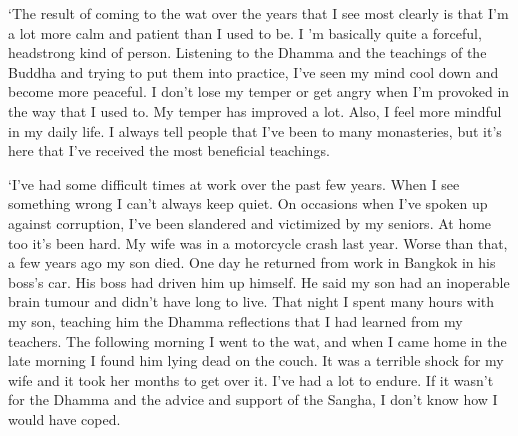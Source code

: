`The result of coming to the wat over the years that I see most clearly
is that I'm a lot more calm and patient than I used to be. I 'm
basically quite a forceful, headstrong kind of person. Listening to the
Dhamma and the teachings of the Buddha and trying to put them into
practice, I've seen my mind cool down and become more peaceful. I don't
lose my temper or get angry when I'm provoked in the way that I used to.
My temper has improved a lot. Also, I feel more mindful in my daily
life. I always tell people that I've been to many monasteries, but it's
here that I've received the most beneficial teachings.

`I've had some difficult times at work over the past few years. When I
see something wrong I can't always keep quiet. On occasions when I've
spoken up against corruption, I've been slandered and victimized by my
seniors. At home too it's been hard. My wife was in a motorcycle crash
last year. Worse than that, a few years ago my son died. One day he
returned from work in Bangkok in his boss's car. His boss had driven him
up himself. He said my son had an inoperable brain tumour and didn't
have long to live. That night I spent many hours with my son, teaching
him the Dhamma reflections that I had learned from my teachers. The
following morning I went to the wat, and when I came home in the late
morning I found him lying dead on the couch. It was a terrible shock for
my wife and it took her months to get over it. I've had a lot to endure.
If it wasn't for the Dhamma and the advice and support of the Sangha, I
don't know how I would have coped.

